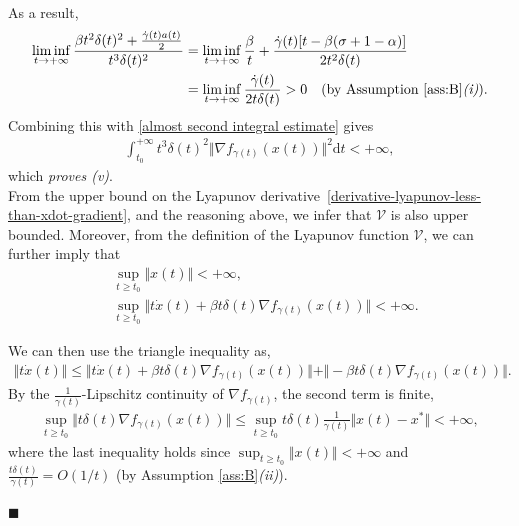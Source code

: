 \documentclass[11pt]{article}
\numberwithin{equation}{section}
\newenvironment{proof}{\bigskip\noindent{\bf Proof.}}{\hfill $\blacksquare$ \par\bigskip\noindent}
\begin{document}
\begin{proof}
\begin{align*}
\end{align*}
As a result, 
\begin{align*}
    \liminf_{t \to +\infty} \frac{\beta t^2\delta(t)^2+\frac{\dot{\gamma}(t)a(t)}{2}}{t^3 \delta(t)^2}&=\liminf_{t \to +\infty} \frac{\beta}{t}+\frac{\dot{\gamma}(t)[t-\beta(\sigma+1-\alpha)]}{2t^2\delta(t)}\\
    &=\liminf_{t \to +\infty}\frac{\dot{\gamma}(t)}{2t\delta(t)} > 0 \quad (\text{by Assumption \ref{ass:B}\textit{(i)}}).
\end{align*}
Combining this with \eqref{almost second integral estimate} gives 
\begin{align}
\label{ine: item iv}
\displaystyle \int_{t_0}^{+\infty}t^3\delta(t)^2\Vert \nabla f_{\gamma(t)}(x(t))\Vert^2 \mathrm{d}t <+\infty, 
\end{align}
which \emph{proves \textit{(v)}}. \\
From the upper bound on the Lyapunov derivative~\eqref{derivative-lyapunov-less-than-xdot-gradient}, and the reasoning above, we infer that $\mathcal{V}$ is also upper bounded. Moreover, from the definition of the Lyapunov function $\mathcal{V}$, we can further imply that 
\begin{align}
    &\sup_{t \geq t_0} \Vert x(t) \Vert <+\infty, \\
    &\sup_{t\geq t_0} \Vert t\dot{x}(t)+\beta t\delta(t)\nabla f_{\gamma(t)}(x(t))\Vert <+\infty. \label{dummy00}
\end{align}

We can then use the triangle inequality as,
\begin{align*}
\Vert t\dot{x}(t)\Vert \le \Vert t\dot{x}(t)+\beta t\delta(t)\nabla f_{\gamma(t)}(x(t))\Vert + \Vert -\beta t\delta(t)\nabla f_{\gamma(t)}(x(t)) \Vert.
\end{align*}
By the $\frac{1}{\gamma(t)}$-Lipschitz continuity of $\nabla f_{\gamma(t)}$, the second term is finite, 
\begin{align*}
    \sup_{t\geq t_0}\Vert t\delta(t)\nabla f_{\gamma(t)}(x(t))\Vert \le \sup_{t \geq t_0}t\delta(t)\frac{1}{\gamma(t)}\Vert x(t)-x^* \Vert <+\infty,
\end{align*}
where the last inequality holds since $\sup_{t \geq t_0} \Vert x(t) \Vert <+\infty$ and $\frac{t\delta(t)}{\gamma(t)}=O(1/t)$ (by Assumption \ref{ass:B}\textit{(ii)}). 


\end{proof}
\end{document}
